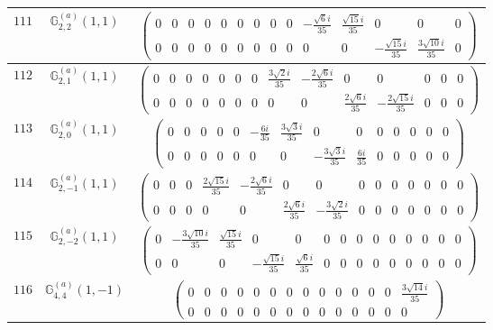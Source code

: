 \documentclass[fleqn,8pt,landscape]{jsarticle}
\begin{document}
\begin{center}
\begin{longtable}{ccc}
$ 111 $ & $ \mathbb{G}_{2,2}^{(a)}(1,1) $ & $ \begin{pmatrix} 0 & 0 & 0 & 0 & 0 & 0 & 0 & 0 & 0 & - \frac{\sqrt{6} i}{35} & \frac{\sqrt{15} i}{35} & 0 & 0 & 0 \\ 0 & 0 & 0 & 0 & 0 & 0 & 0 & 0 & 0 & 0 & 0 & - \frac{\sqrt{15} i}{35} & \frac{3 \sqrt{10} i}{35} & 0 \end{pmatrix} $ \\ \hline
$ 112 $ & $ \mathbb{G}_{2,1}^{(a)}(1,1) $ & $ \begin{pmatrix} 0 & 0 & 0 & 0 & 0 & 0 & 0 & \frac{3 \sqrt{2} i}{35} & - \frac{2 \sqrt{6} i}{35} & 0 & 0 & 0 & 0 & 0 \\ 0 & 0 & 0 & 0 & 0 & 0 & 0 & 0 & 0 & \frac{2 \sqrt{6} i}{35} & - \frac{2 \sqrt{15} i}{35} & 0 & 0 & 0 \end{pmatrix} $ \\ \hline
$ 113 $ & $ \mathbb{G}_{2,0}^{(a)}(1,1) $ & $ \begin{pmatrix} 0 & 0 & 0 & 0 & 0 & - \frac{6 i}{35} & \frac{3 \sqrt{3} i}{35} & 0 & 0 & 0 & 0 & 0 & 0 & 0 \\ 0 & 0 & 0 & 0 & 0 & 0 & 0 & - \frac{3 \sqrt{3} i}{35} & \frac{6 i}{35} & 0 & 0 & 0 & 0 & 0 \end{pmatrix} $ \\ \hline
$ 114 $ & $ \mathbb{G}_{2,-1}^{(a)}(1,1) $ & $ \begin{pmatrix} 0 & 0 & 0 & \frac{2 \sqrt{15} i}{35} & - \frac{2 \sqrt{6} i}{35} & 0 & 0 & 0 & 0 & 0 & 0 & 0 & 0 & 0 \\ 0 & 0 & 0 & 0 & 0 & \frac{2 \sqrt{6} i}{35} & - \frac{3 \sqrt{2} i}{35} & 0 & 0 & 0 & 0 & 0 & 0 & 0 \end{pmatrix} $ \\ \hline
$ 115 $ & $ \mathbb{G}_{2,-2}^{(a)}(1,1) $ & $ \begin{pmatrix} 0 & - \frac{3 \sqrt{10} i}{35} & \frac{\sqrt{15} i}{35} & 0 & 0 & 0 & 0 & 0 & 0 & 0 & 0 & 0 & 0 & 0 \\ 0 & 0 & 0 & - \frac{\sqrt{15} i}{35} & \frac{\sqrt{6} i}{35} & 0 & 0 & 0 & 0 & 0 & 0 & 0 & 0 & 0 \end{pmatrix} $ \\ \hline
$ 116 $ & $ \mathbb{G}_{4,4}^{(a)}(1,-1) $ & $ \begin{pmatrix} 0 & 0 & 0 & 0 & 0 & 0 & 0 & 0 & 0 & 0 & 0 & 0 & 0 & \frac{3 \sqrt{14} i}{35} \\ 0 & 0 & 0 & 0 & 0 & 0 & 0 & 0 & 0 & 0 & 0 & 0 & 0 & 0 \end{pmatrix} $ \\ \hline

\end{longtable}
\end{center}
\end{document}
